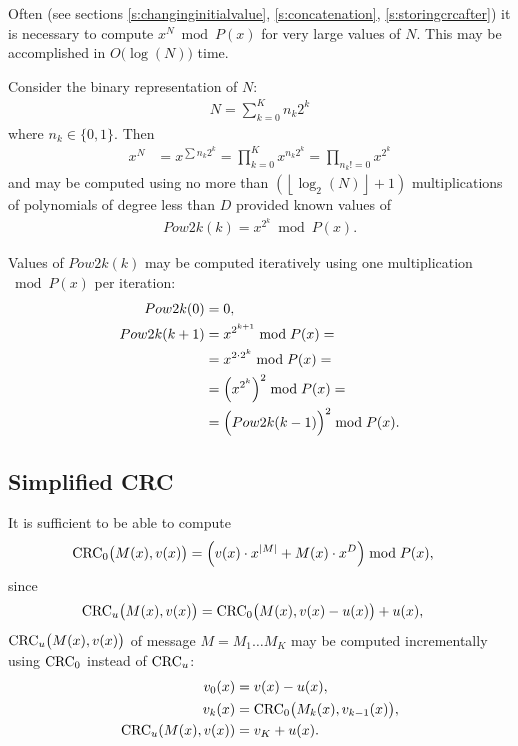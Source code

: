 \documentclass{article}
\begin{document}
Often (see sections \ref{s:changinginitialvalue}, \ref{s:concatenation},
\ref{s:storingcrcafter}) it is necessary to compute $x^N \bmod P(x)$ for
very large values of $N$. This may be accomplished in
$O\bigl(\log(N)\bigr)$ time.

Consider the binary representation of $N$:
  \begin{align*}
    N = \sum_{k=0}^K n_k 2^k
  \end{align*}
where $n_k \in \{0, 1\}$. Then
  \begin{align}
    x^N &= x^{\sum n_k 2^k}
         = \prod_{k=0}^K x^{n_k 2^k}
         = \prod_{n_k != 0} x^{2^k} \label{e:pow2k}
  \end{align}
and may be computed using no more than
    $\left(\left\lfloor \log_2(N) \right\rfloor + 1\right)$
multiplications of polynomials of degree less than $D$ provided known
values of
  \begin{align}
    Pow2k(k) = x^{2^k} \bmod P(x).
  \end{align}

Values of $Pow2k(k)$ may be computed iteratively using one multiplication
$\bmod P(x)$ per iteration:
  \begin{align*}
    Pow2k(0) &= 0, \\
    Pow2k(k + 1)
      &= x^{2^{k+1}} \bmod P(x) = \\
      &= x^{2 \cdot 2^k} \bmod P(x) = \\
      &= \left(x^{2^k}\right)^2 \bmod P(x) = \\
      &= \Bigl(Pow2k(k-1)\Bigr)^2 \bmod P(x).
  \end{align*}

\subsection{Simplified CRC}

It is sufficient to be able to compute
  \begin{align}
    {\rm CRC}_0\bigl(M(x), v(x)\bigr)
      &= \Bigl(v(x) \cdot x^{|M|} + M(x) \cdot x^D\Bigr)
        \bmod P(x), \label{e:simplifiedcrc}
  \end{align}
since
  \begin{align*}
    {\rm CRC}_u\bigl(M(x),v(x)\bigr) &= {\rm CRC}_0\bigl(M(x), v(x) - u(x)\bigr) + u(x),
  \end{align*}
${\rm CRC}_u\bigl(M(x),v(x)\bigr)$ of message $M = M_1 \ldots M_K$ may be computed
incrementally using ${\rm CRC}_0$ instead of ${\rm CRC}_u$:
  \begin{align*}
    v_0(x) &= v(x) - u(x), \\
    v_k(x) &= {\rm CRC}_0\bigl(M_k(x),v_{k-1}(x)\bigr), \\
    {\rm CRC}_u(M(x), v(x)) &= v_K + u(x).
  \end{align*}
\end{document}
